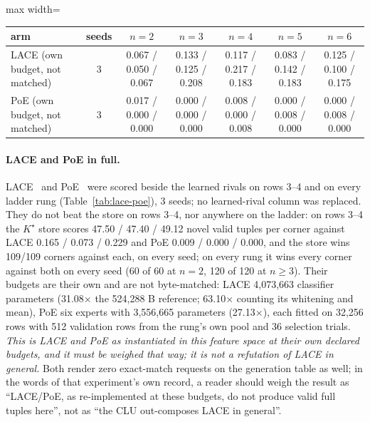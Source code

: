 \documentclass{article} %
\newcommand{\Kstar}{\ensuremath{K^{\star}}}
\begin{document}
\begin{table}[h]
\medskip
\begin{adjustbox}{max width=\linewidth}\begin{tabular}{lcccccc}
\toprule
arm & seeds & $n=2$ & $n=3$ & $n=4$ & $n=5$ & $n=6$ \\
\midrule
LACE (own budget, not matched) & 3 & 0.067 / 0.050 / 0.067 & 0.133 / 0.125 / 0.208 & 0.117 / 0.217 / 0.183 & 0.083 / 0.142 / 0.183 & 0.125 / 0.100 / 0.175 \\
PoE (own budget, not matched) & 3 & 0.017 / 0.000 / 0.000 & 0.000 / 0.000 / 0.000 & 0.008 / 0.000 / 0.008 & 0.000 / 0.008 / 0.000 & 0.000 / 0.008 / 0.000 \\
\bottomrule
\end{tabular}\end{adjustbox}
\end{table}

\paragraph{LACE and PoE in full.}
LACE~\citep{nie2021controllable} and PoE~\citep{hinton2002training} were scored beside the
learned rivals on rows 3--4 and on every ladder rung (Table~\ref{tab:lace-poe}), 3 seeds; no
learned-rival column was replaced. They do not beat the
store on rows 3--4, nor anywhere on the ladder: on rows 3--4 the $\Kstar$ store scores 47.50 / %
47.40 / 49.12 novel valid tuples per corner against LACE 0.165 / 0.073 / 0.229 and PoE 0.009 / %
0.000 / 0.000, and the store wins 109/109 corners against each, on every seed; on every rung it %
wins every corner against both on every seed (60 of 60 at $n=2$, 120 of 120 at $n\ge3$). %
Their budgets are their own and are not byte-matched: LACE 4,073,663 classifier parameters %
(31.08$\times$ the 524,288 B reference; 63.10$\times$ counting its whitening and mean), PoE six %
experts with 3,556,665 parameters (27.13$\times$), each fitted on 32,256 rows with 512 validation %
rows from the rung's own pool and 36 selection trials. %
\emph{This is LACE and PoE as instantiated in this feature space at their own declared budgets,
and it must be weighed that way; it is not a refutation of LACE in general.} Both render zero
exact-match requests on the generation table as well; in the words of that experiment's own record, a
reader should weigh the result as ``LACE/PoE, as re-implemented at these budgets, do not produce
valid full tuples here'', not as ``the CLU out-composes LACE in general''. %
\end{document}
